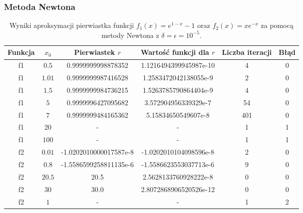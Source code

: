 \documentclass{article}
\begin{document}
\subsubsection{Metoda Newtona}
\begin{table}[H]
\begin{adjustbox}{center}
\begin{tabular}{|c|c|c|c|c|c|}
    \hline
    Funkcja & $x_0$ & Pierwiastek $r$ & Wartość funkcji dla $r$ & Liczba iteracji & Błąd\\
    \hline
    f1 & $0.5$ & 0.9999999998878352 & 1.1216494399945987e-10 & 4 & 0\\
    \hline
    f1 & $1.01$ & 0.9999999987416528 & 1.2583472042138055e-9 & 2 & 0\\
    \hline
    f1 & $1.5$ & 0.9999999984736215 & 1.5263785790864404e-9 & 4 & 0\\
    \hline
    f1 & $5$ & 0.9999996427095682 & 3.572904956339329e-7 & 54 & 0\\
    \hline
    f1 & $7$ & 0.9999999484165362 & 5.15834650549607e-8 & 401 & 0\\
    \hline
    f1 & $20$ & - & - & 1 & 1\\
    \hline
    f1 & $100$ & - & - & 1 & 1\\
    \hline
    \hline
    f2 & $0.01$ & -1.0202010000017587e-8 & -1.0202010104098596e-8 & 2 & 0\\
    \hline
    f2 & $0.8$ & -1.5586599258811135e-6 & -1.5586623553037713e-6 & 9 & 0\\
    \hline
    f2 & $20.5$ & 20.5 & 2.5628133760928222e-8 & 0 & 0\\
    \hline
    f2 & $30$ & 30.0 & 2.8072868906520526e-12 & 0 & 0\\
    \hline
    f2 & $1$ & - & - & 1 & 2\\
    \hline
\end{tabular}
\end{adjustbox}
\caption{Wyniki aproksymacji pierwiastka funkcji \( f_1(x) = e^{1-x} - 1 \) oraz \( f_2(x) = x e^{-x} \) za pomocą metody Newtona z $\delta = \epsilon = 10^{-5}$.}
\end{table}
\end{document}
